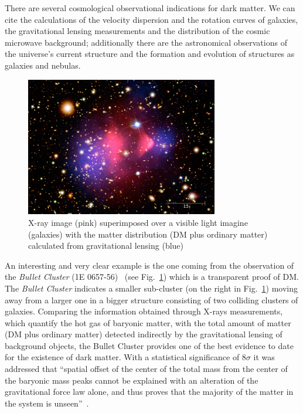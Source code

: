 There are several cosmological observational indications for dark matter. We can cite the calculations of the velocity dispersion and the rotation curves of galaxies, the gravitational lensing measurements and the distribution of the cosmic microwave background; additionally there are the astronomical observations of the universe's current structure and the formation and evolution of structures as galaxies and nebulas.\\
\begin{figure}[h]
\centering
\includegraphics[width=0.75\textwidth]{Figures/c1/bullet.jpg}
\caption{X-ray image (pink) superimposed over a visible light imagine (galaxies) with the matter distribution (DM plus ordinary matter) calculated from gravitational lensing (blue)~\cite{webpage_bullet}}
\label{fig:bullet}
\end{figure}
An interesting and very clear example is the one coming from the observation of the \emph{Bullet Cluster} (1E 0657-56)~\cite{Clowe_2004} (see Fig.~\ref{fig:bullet}) which is a transparent proof of DM. The \emph{Bullet Cluster} indicates a smaller sub-cluster (on the right in Fig.~\ref{fig:bullet}) moving away from a larger one in a bigger structure consisting of two colliding clusters of galaxies. Comparing the information obtained through X-rays measurements, which quantify the hot gas of baryonic matter, with the total amount of matter (DM plus ordinary matter) detected indirectly by the gravitational lensing of background objects, the Bullet Cluster provides 
one of the best evidence to date for the existence of dark matter. With a statistical significance of 8$\sigma$ it was addressed that ``spatial offset of the center of the total mass from the center of the baryonic mass peaks cannot be explained with an alteration of the gravitational force law alone, and thus proves that the majority of the matter in the system is unseen''~\cite{Clowe_2006}.

